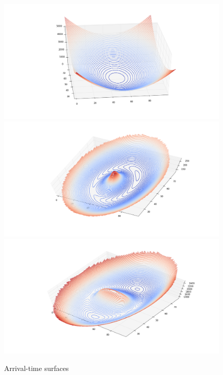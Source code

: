 
\begin{figure}
\includegraphics[height=.3\vsize]{fig/arriv1.png}
\includegraphics[height=.3\vsize]{fig/arriv2.png}
\includegraphics[height=.3\vsize]{fig/arriv3.png}
\caption{Arrival-time surfaces\label{fig:arriv}}
\end{figure}

